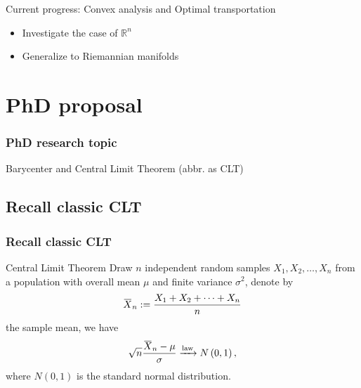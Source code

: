 \documentclass[aspectratio=169]{beamer}
\newcommand{\overbar}[1]{\mkern 1.5mu\overline{\mkern-1.5mu#1\mkern-1.5mu}\mkern 1.5mu}
\begin{document}
\begin{frame}
{	}
	\pause
	\begin{block}{Current progress: Convex analysis and Optimal transportation}
		\begin{itemize}
			\item Investigate the case of $\mathbb{R}^n$
			      \pause
			\item Generalize to Riemannian manifolds
		\end{itemize}
	\end{block}
\end{frame}

\section{PhD proposal}
\begin{frame}
	\frametitle{PhD research topic}
	\begin{center}
		\huge	Barycenter and Central Limit Theorem \normalsize (abbr. as CLT)
	\end{center}
\end{frame}

\subsection{Recall classic CLT}
\begin{frame}
	\frametitle{Recall classic CLT}
	\begin{block}{Central Limit Theorem}
		Draw $n$ independent random samples $X_1, X_2, \ldots, X_n$ from a population with overall mean $\mu$ and finite variance $\sigma^2$, denote by
		\[
			\overbar {X}_{n}:= \frac{X_1 + X_2 + \cdots + X_n}{n}
		\]
		the sample mean, we have
		\[
			\sqrt{n}\frac{\overbar {X}_{n}-\mu }{\sigma} \xrightarrow {\text{law}} N\left(0,1\right),
		\]
		where $N(0,1)$ is the standard normal distribution.
	\end{block}
\end{frame}
\end{document}
